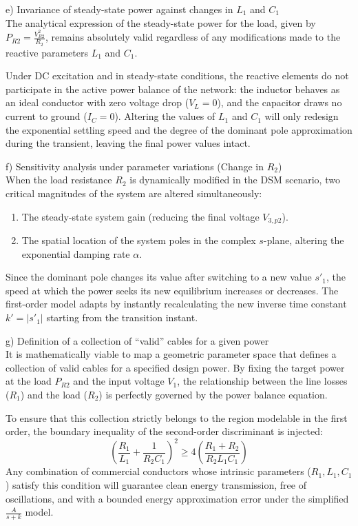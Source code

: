 \documentclass[11pt, a4paper]{article}
\begin{document}
\medskip\noindent
e) Invariance of steady-state power against changes in $L_1$ and $C_1$\\
The analytical expression of the steady-state power for the load, given by $P_{R2} = \frac{V_{R2}^2}{R_2}$, remains absolutely valid regardless of any modifications made to the reactive parameters $L_1$ and $C_1$.

Under DC excitation and in steady-state conditions, the reactive elements do not participate in the active power balance of the network: the inductor behaves as an ideal conductor with zero voltage drop ($V_L = 0$), and the capacitor draws no current to ground ($I_C = 0$). Altering the values of $L_1$ and $C_1$ will only redesign the exponential settling speed and the degree of the dominant pole approximation during the transient, leaving the final power values intact.

\medskip\noindent
f) Sensitivity analysis under parameter variations (Change in $R_2$) \\
When the load resistance $R_2$ is dynamically modified in the DSM scenario, two critical magnitudes of the system are altered simultaneously:
\begin{enumerate}
    \item The steady-state system gain (reducing the final voltage $V_{3,p2}$).
    \item The spatial location of the system poles in the complex $s$-plane, altering the exponential damping rate $\alpha$.
\end{enumerate}
Since the dominant pole changes its value after switching to a new value $s'_1$, the speed at which the power seeks its new equilibrium increases or decreases. The first-order model adapts by instantly recalculating the new inverse time constant $k' = |s'_1|$ starting from the transition instant.

\medskip\noindent
g) Definition of a collection of ``valid'' cables for a given power \\
It is mathematically viable to map a geometric parameter space that defines a collection of valid cables for a specified design power. By fixing the target power at the load $P_{R2}$ and the input voltage $V_1$, the relationship between the line losses ($R_1$) and the load ($R_2$) is perfectly governed by the power balance equation.

To ensure that this collection strictly belongs to the region modelable in the first order, the boundary inequality of the second-order discriminant is injected:
\[ \left( \frac{R_1}{L_1} + \frac{1}{R_2C_1} \right)^2 \ge 4 \left( \frac{R_1 + R_2}{R_2L_1C_1} \right) \]
Any combination of commercial conductors whose intrinsic parameters ($R_1, L_1, C_1$) satisfy this condition will guarantee clean energy transmission, free of oscillations, and with a bounded energy approximation error under the simplified $\frac{A}{s+k}$ model.
\end{document}
